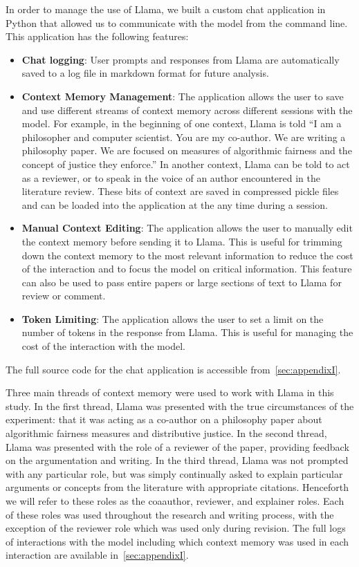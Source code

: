 \documentclass[11pt, a4paper, hyphens]{article}
\begin{document}
In order to manage the use of Llama, we built a custom chat application in
Python that allowed us to communicate with the model from the command line.
This application has the following features:
\begin{itemize}
    \item \textbf{Chat logging}: User prompts and responses from Llama are
    automatically saved to a log file in markdown format for future analysis.
    \item \textbf{Context Memory Management}: The application allows the user
    to save and use different streams of context memory across different
    sessions with the model. For example, in the beginning of one context, Llama
    is told ``I am a philosopher and computer scientist. You are my co-author.
    We are writing a philosophy paper. We are focused on measures of algorithmic
    fairness and the concept of justice they enforce.'' In another context,
    Llama can be told to act as a reviewer, or to speak in the voice of an
    author encountered in the literature review. These bits of context are saved
    in compressed pickle files and can be loaded into the application at the
    any time during a session.
    \item \textbf{Manual Context Editing}: The application allows the user to
    manually edit the context memory before sending it to Llama. This is useful
    for trimming down the context memory to the most relevant information to
    reduce the cost of the interaction and to focus the model on critical
    information. This feature can also be used to pass entire papers or large
    sections of text to Llama for review or comment.
    \item \textbf{Token Limiting}: The application allows the user to set a
    limit on the number of tokens in the response from Llama. This is useful for
    managing the cost of the interaction with the model.
\end{itemize}
The full source code for the chat application is accessible
from~\ref{sec:appendixI}.

Three main threads of context memory were used to work with Llama in this study.
In the first thread, Llama was presented with the true circumstances of the
experiment: that it was acting as a co-author on a philosophy paper about
algorithmic fairness measures and distributive justice. In the second thread,
Llama was presented with the role of a reviewer of the paper, providing feedback
on the argumentation and writing. In the third thread, Llama was not prompted
with any particular role, but was simply continually asked to explain particular
arguments or concepts from the literature with appropriate citations. Henceforth
we will refer to these roles as the coaauthor, reviewer, and explainer roles. 
Each of these roles was used throughout the research and writing process, with
the exception of the reviewer role which was used only during revision. The full
logs of interactions with the model including which context memory was used in
each interaction are available in~\ref{sec:appendixI}.
\end{document}

